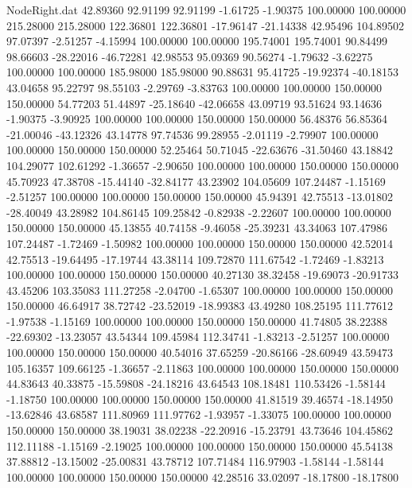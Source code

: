 \begin{filecontents}{NodeRight.dat}
  42.89360   92.91199   92.91199    -1.61725   -1.90375  100.00000  100.00000  215.28000  215.28000  122.36801  122.36801  -17.96147  -21.14338
  42.95496  104.89502   97.07397    -2.51257   -4.15994  100.00000  100.00000  195.74001  195.74001   90.84499   98.66603  -28.22016  -46.72281
  42.98553   95.09369   90.56274    -1.79632   -3.62275  100.00000  100.00000  185.98000  185.98000   90.88631   95.41725  -19.92374  -40.18153
  43.04658   95.22797   98.55103    -2.29769   -3.83763  100.00000  100.00000  150.00000  150.00000   54.77203   51.44897  -25.18640  -42.06658
  43.09719   93.51624   93.14636    -1.90375   -3.90925  100.00000  100.00000  150.00000  150.00000   56.48376   56.85364  -21.00046  -43.12326
  43.14778   97.74536   99.28955    -2.01119   -2.79907  100.00000  100.00000  150.00000  150.00000   52.25464   50.71045  -22.63676  -31.50460
  43.18842  104.29077  102.61292    -1.36657   -2.90650  100.00000  100.00000  150.00000  150.00000   45.70923   47.38708  -15.44140  -32.84177
  43.23902  104.05609  107.24487    -1.15169   -2.51257  100.00000  100.00000  150.00000  150.00000   45.94391   42.75513  -13.01802  -28.40049
  43.28982  104.86145  109.25842    -0.82938   -2.22607  100.00000  100.00000  150.00000  150.00000   45.13855   40.74158   -9.46058  -25.39231
  43.34063  107.47986  107.24487    -1.72469   -1.50982  100.00000  100.00000  150.00000  150.00000   42.52014   42.75513  -19.64495  -17.19744
  43.38114  109.72870  111.67542    -1.72469   -1.83213  100.00000  100.00000  150.00000  150.00000   40.27130   38.32458  -19.69073  -20.91733
  43.45206  103.35083  111.27258    -2.04700   -1.65307  100.00000  100.00000  150.00000  150.00000   46.64917   38.72742  -23.52019  -18.99383
  43.49280  108.25195  111.77612    -1.97538   -1.15169  100.00000  100.00000  150.00000  150.00000   41.74805   38.22388  -22.69302  -13.23057
  43.54344  109.45984  112.34741    -1.83213   -2.51257  100.00000  100.00000  150.00000  150.00000   40.54016   37.65259  -20.86166  -28.60949
  43.59473  105.16357  109.66125    -1.36657   -2.11863  100.00000  100.00000  150.00000  150.00000   44.83643   40.33875  -15.59808  -24.18216
  43.64543  108.18481  110.53426    -1.58144   -1.18750  100.00000  100.00000  150.00000  150.00000   41.81519   39.46574  -18.14950  -13.62846
  43.68587  111.80969  111.97762    -1.93957   -1.33075  100.00000  100.00000  150.00000  150.00000   38.19031   38.02238  -22.20916  -15.23791
  43.73646  104.45862  112.11188    -1.15169   -2.19025  100.00000  100.00000  150.00000  150.00000   45.54138   37.88812  -13.15002  -25.00831
  43.78712  107.71484  116.97903    -1.58144   -1.58144  100.00000  100.00000  150.00000  150.00000   42.28516   33.02097  -18.17800  -18.17800

\end{filecontents}
